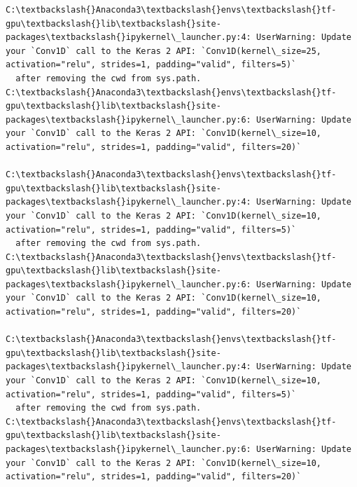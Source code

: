 \documentclass[11pt]{article}
\begin{document}
    \begin{Verbatim}[commandchars=\\\{\}]
C:\textbackslash{}Anaconda3\textbackslash{}envs\textbackslash{}tf-gpu\textbackslash{}lib\textbackslash{}site-packages\textbackslash{}ipykernel\_launcher.py:4: UserWarning: Update your `Conv1D` call to the Keras 2 API: `Conv1D(kernel\_size=25, activation="relu", strides=1, padding="valid", filters=5)`
  after removing the cwd from sys.path.
C:\textbackslash{}Anaconda3\textbackslash{}envs\textbackslash{}tf-gpu\textbackslash{}lib\textbackslash{}site-packages\textbackslash{}ipykernel\_launcher.py:6: UserWarning: Update your `Conv1D` call to the Keras 2 API: `Conv1D(kernel\_size=10, activation="relu", strides=1, padding="valid", filters=20)`
  
C:\textbackslash{}Anaconda3\textbackslash{}envs\textbackslash{}tf-gpu\textbackslash{}lib\textbackslash{}site-packages\textbackslash{}ipykernel\_launcher.py:4: UserWarning: Update your `Conv1D` call to the Keras 2 API: `Conv1D(kernel\_size=10, activation="relu", strides=1, padding="valid", filters=5)`
  after removing the cwd from sys.path.
C:\textbackslash{}Anaconda3\textbackslash{}envs\textbackslash{}tf-gpu\textbackslash{}lib\textbackslash{}site-packages\textbackslash{}ipykernel\_launcher.py:6: UserWarning: Update your `Conv1D` call to the Keras 2 API: `Conv1D(kernel\_size=10, activation="relu", strides=1, padding="valid", filters=20)`
  
C:\textbackslash{}Anaconda3\textbackslash{}envs\textbackslash{}tf-gpu\textbackslash{}lib\textbackslash{}site-packages\textbackslash{}ipykernel\_launcher.py:4: UserWarning: Update your `Conv1D` call to the Keras 2 API: `Conv1D(kernel\_size=10, activation="relu", strides=1, padding="valid", filters=5)`
  after removing the cwd from sys.path.
C:\textbackslash{}Anaconda3\textbackslash{}envs\textbackslash{}tf-gpu\textbackslash{}lib\textbackslash{}site-packages\textbackslash{}ipykernel\_launcher.py:6: UserWarning: Update your `Conv1D` call to the Keras 2 API: `Conv1D(kernel\_size=10, activation="relu", strides=1, padding="valid", filters=20)`
  

    \end{Verbatim}
\end{document}
